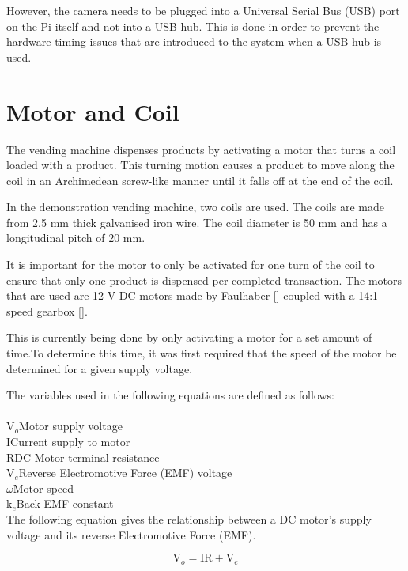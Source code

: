 However, the camera needs to be plugged into a Universal Serial Bus (USB) port
on the Pi itself and not into a USB hub. This is done in order to prevent the
hardware timing issues that are introduced to the system when a USB hub is used. 

\section{Motor and Coil}

The vending machine dispenses products by activating a motor that turns a coil
loaded with a product. This turning motion causes a product to move along the
coil in an Archimedean screw-like manner until it falls off at the end of the
coil. 

In the demonstration vending machine, two coils are used. The coils are made
from 2.5 mm thick galvanised iron wire. The coil diameter is 50 mm and has a
longitudinal pitch of 20 mm. 

It is important for the motor to only be activated for one turn of the coil to
ensure that only one product is dispensed per completed transaction. The motors
that are used are 12 V DC motors made by Faulhaber [\cite{manual:dc-motors}]
coupled with a 14:1 speed gearbox [\cite{manual:gearbox}].

This is currently being done by only activating a motor for a set amount of
time.To determine this time, it was first required that the speed of the motor
be determined for a given supply voltage. 

The variables used in the following equations are defined as follows:\\\\
V$_o$\dotfill Motor supply voltage\\
I\dotfill Current supply to motor\\
R\dotfill DC Motor terminal resistance\\
V$_e$\dotfill Reverse Electromotive Force (EMF) voltage\\
$\omega$\dotfill Motor speed\\
k$_e$\dotfill Back-EMF constant\\

The following equation gives the relationship between a DC motor's supply
voltage and its reverse Electromotive Force (EMF).

\[ \mathrm{V}_o = \mathrm{IR} + \mathrm{V}_e\]


